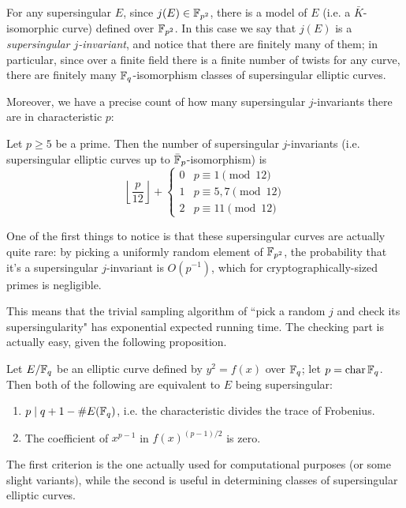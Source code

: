 For any supersingular $E$, since $j(E)\in\mathbb{F}_{p^2}$, there is a model of $E$ (i.e. a $\bar K$-isomorphic curve) defined over $\mathbb{F}_{p^2}$. In this case we say that $j(E)$ is a \emph{supersingular $j$-invariant}, and notice that there are finitely many of them; in particular, since over a finite field there is a finite number of twists for any curve, there are finitely many $\mathbb{F}_q$-isomorphism classes of supersingular elliptic curves.

Moreover, we have a precise count of how many supersingular $j$-invariants there are in characteristic $p$:
\begin{theorem}
    Let $p\ge5$ be a prime. Then the number of supersingular $j$-invariants (i.e. supersingular elliptic curves up to $\bar{\mathbb{F}}_p$-isomorphism) is
    $$\left\lfloor \frac{p}{12} \right\rfloor + \begin{cases}
    0 & p\equiv1\pmod{12}\\
    1 & p\equiv5,7\pmod{12}\\
    2 & p\equiv11\pmod{12}
    \end{cases}$$
\end{theorem}

One of the first things to notice is that these supersingular curves are actually quite rare: by picking a uniformly random element of $\mathbb{F}_{p^2}$, the probability that it's a supersingular $j$-invariant is $O(p^{-1})$, which for cryptographically-sized primes is negligible.

This means that the trivial sampling algorithm of ``pick a random $j$ and check its supersingularity" has exponential expected running time. The checking part is actually easy, given the following proposition.
\begin{proposition}
    Let $E/\mathbb{F}_q$ be an elliptic curve defined by $y^2=f(x)$ over $\mathbb{F}_q$; let $p=\operatorname{char}\mathbb{F}_q$. Then both of the following are equivalent to $E$ being supersingular:
    \begin{enumerate}
        \item $p\mid q+1-\# E(\mathbb{F}_q)$, i.e. the characteristic divides the trace of Frobenius.
        \item The coefficient of $x^{p-1}$ in $f(x)^{(p-1)/2}$ is zero.
    \end{enumerate}
\end{proposition}

The first criterion is the one actually used for computational purposes (or some slight variants), while the second is useful in determining classes of supersingular elliptic curves.

